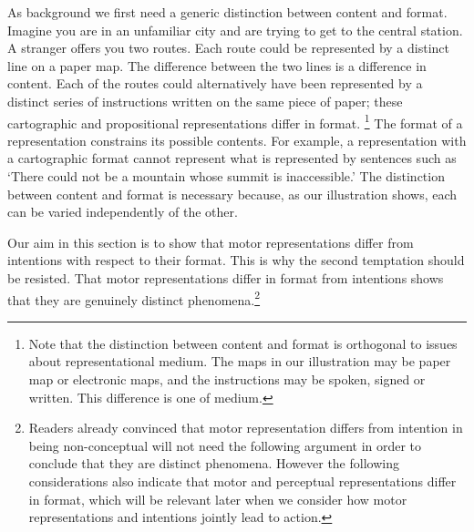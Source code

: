 \documentclass[12pt,\papersize]{extarticle}
\begin{document}
As background we first need a generic distinction between content and format. Imagine you are in an unfamiliar city and are trying to get to the central station. A stranger offers you two routes. Each route could be represented by a distinct line on a paper map. The difference between the two lines is a difference in content. Each of the routes could alternatively have been represented by a distinct series of instructions written on the same piece of paper; these cartographic and propositional representations differ in format.%
\footnote{Note that the distinction between content and format is orthogonal to issues about representational medium. The maps in our illustration may be paper map or electronic maps, and the instructions may be spoken, signed or written. This difference is one of medium.
} 
The format of a representation constrains its possible contents. For example, a representation with a cartographic format cannot represent what is represented by sentences such as `There could not be a mountain whose summit is inaccessible.'  The distinction between content and format is necessary because, as our illustration shows, each can be varied independently of the other.

Our aim in this section is to show that motor representations differ from intentions with respect to their format. This is why the second temptation should be resisted. That motor representations differ in format from intentions shows that they are genuinely distinct phenomena.\footnote{ Readers already convinced that motor representation differs from intention in being non-conceptual will not need the following argument in order to conclude that they are distinct phenomena. However the following considerations also indicate that motor and perceptual representations differ in format, which will be relevant later when we consider how motor representations and intentions jointly lead to action.}
\end{document}
